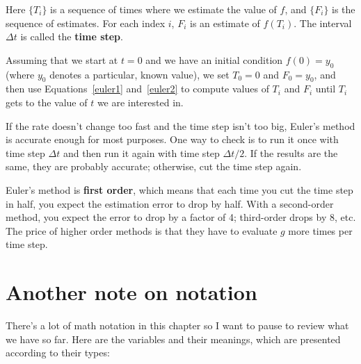 \documentclass{book}
\begin{document}
Here $\{T_i\}$ is a sequence of times where we estimate the value
of $f$, and $\{F_i\}$ is the sequence of estimates.  For each
index $i$, $F_i$ is an estimate of $f(T_i)$.
The interval $\Delta t$ is called the {\bf time step}.

Assuming that we start at $t=0$ and we have an initial condition $f(0)
= y_0$ (where $y_0$ denotes a particular, known value), we set
$T_0 = 0$ and $F_0 = y_0$, and then use 
Equations~\ref{euler1} and~\ref{euler2} to
compute values of $T_i$ and $F_i$ until $T_i$ 
gets to the value of $t$ we are interested in.

If the rate doesn't change too fast and the time step isn't
too big, Euler's method is accurate enough for most purposes.  One
way to check is to run it once with time step $\Delta t$ and then run it
again with time step $\Delta t/2$.  If the results are the same, they are
probably accurate; otherwise, cut the time step again.

Euler's method is {\bf first order}, which means that each time you
cut the time step in half, you expect the estimation error to drop by
half.  With a second-order method, you expect the error to drop by a
factor of 4; third-order drops by 8, etc.  The price of higher order
methods is that they have to evaluate $g$ more times per time step.


\section{Another note on notation}

There's a lot of math notation in this chapter so I want to pause to
review what we have so far.  Here are the variables and their meanings,
which are presented according to their types:
\end{document}
